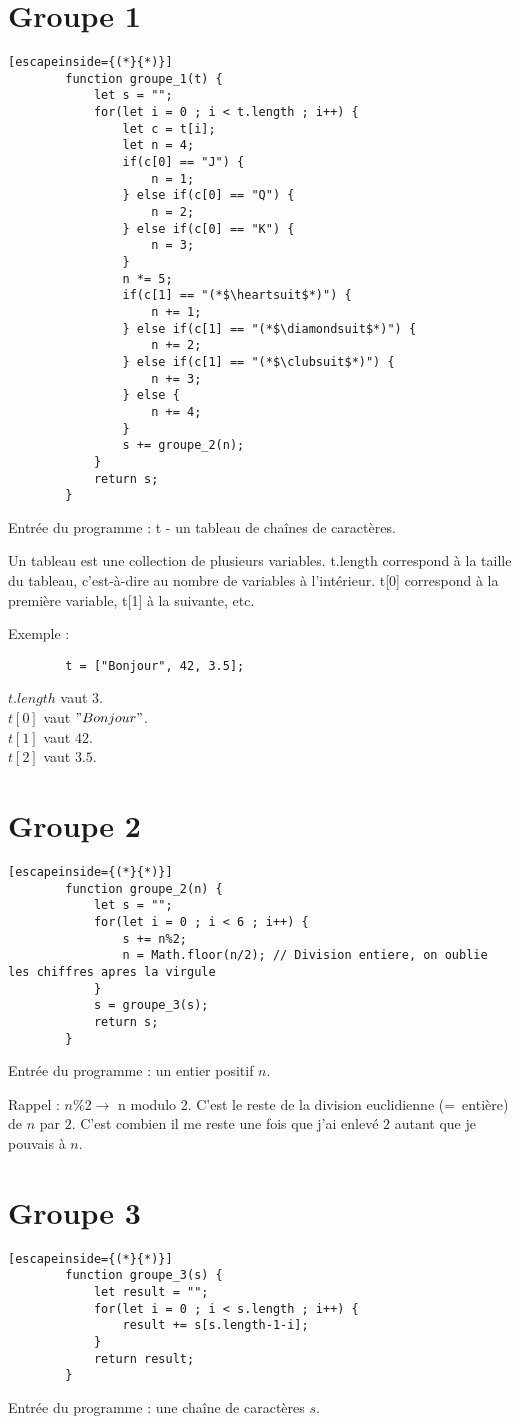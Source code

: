 \documentclass{article}
\begin{document}
	\section*{Groupe 1}
	\begin{lstlisting}[escapeinside={(*}{*)}]
		function groupe_1(t) {
			let s = "";
			for(let i = 0 ; i < t.length ; i++) {
				let c = t[i];
				let n = 4;
				if(c[0] == "J") {
					n = 1;
				} else if(c[0] == "Q") {
					n = 2;
				} else if(c[0] == "K") {
					n = 3;
				}
				n *= 5;
				if(c[1] == "(*$\heartsuit$*)") {
					n += 1;
				} else if(c[1] == "(*$\diamondsuit$*)") {
					n += 2;
				} else if(c[1] == "(*$\clubsuit$*)") {
					n += 3;
				} else {
					n += 4;
				}
				s += groupe_2(n);
			}
			return s;
		}
	\end{lstlisting}
	Entrée du programme : t - un tableau de chaînes de caractères. 
	
	\vspace{1em}
	\noindent Un tableau est une collection de plusieurs variables. t.length correspond à la taille du tableau, c'est-à-dire au nombre de variables à l'intérieur.
	t[0] correspond à la première variable, t[1] à la suivante, etc.
	
	Exemple :
	\begin{lstlisting}
		t = ["Bonjour", 42, 3.5];
	\end{lstlisting}
	$t.length$ vaut $3$.\\$t[0]$ vaut $"Bonjour"$.\\$t[1]$ vaut $42$.\\$t[2]$ vaut $3.5$.
	\newpage
	\section*{Groupe 2}
	\begin{lstlisting}[escapeinside={(*}{*)}]
		function groupe_2(n) {
			let s = "";
			for(let i = 0 ; i < 6 ; i++) {
				s += n%2;
				n = Math.floor(n/2); // Division entiere, on oublie les chiffres apres la virgule
			}
			s = groupe_3(s);
			return s;
		}
	\end{lstlisting}
	Entrée du programme : un entier positif $n$.
	
	\vspace{1em}
	\noindent Rappel : $n\%2 \longrightarrow$ n modulo 2. C'est le reste de la division euclidienne (=~entière) de $n$ par $2$. C'est combien il me reste une fois que j'ai enlevé $2$ autant que je pouvais à $n$.
	
	\newpage
	\section*{Groupe 3}
	\begin{lstlisting}[escapeinside={(*}{*)}]
		function groupe_3(s) {
			let result = "";
			for(let i = 0 ; i < s.length ; i++) {
				result += s[s.length-1-i];
			}
			return result;
		}
	\end{lstlisting}
	Entrée du programme : une chaîne de caractères $s$.
	
\end{document}
